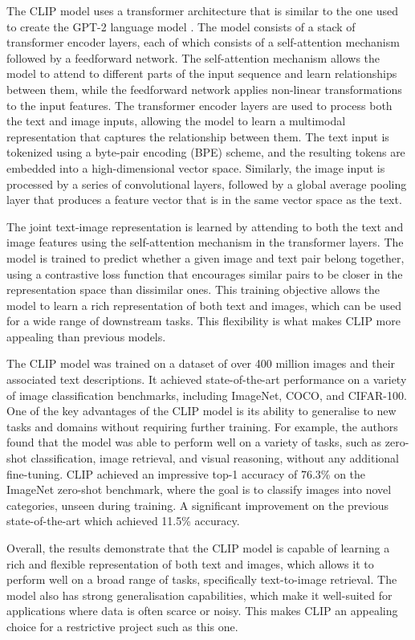 \documentclass{l4proj}
\begin{document}
The CLIP model uses a transformer architecture that is similar to the one used to create the GPT-2 language model \citep{radford2019gpt2}. The model consists of a stack of transformer encoder layers, each of which consists of a self-attention mechanism followed by a feedforward network. The self-attention mechanism allows the model to attend to different parts of the input sequence and learn relationships between them, while the feedforward network applies non-linear transformations to the input features. The transformer encoder layers are used to process both the text and image inputs, allowing the model to learn a multimodal representation that captures the relationship between them. The text input is tokenized using a byte-pair encoding (BPE) scheme, and the resulting tokens are embedded into a high-dimensional vector space. Similarly, the image input is processed by a series of convolutional layers, followed by a global average pooling layer that produces a feature vector that is in the same vector space as the text.

The joint text-image representation is learned by attending to both the text and image features using the self-attention mechanism in the transformer layers. The model is trained to predict whether a given image and text pair belong together, using a contrastive loss function that encourages similar pairs to be closer in the representation space than dissimilar ones. This training objective allows the model to learn a rich representation of both text and images, which can be used for a wide range of downstream tasks. This flexibility is what makes CLIP more appealing than previous models.

The CLIP model was trained on a dataset of over 400 million images and their associated text descriptions. It achieved state-of-the-art performance on a variety of image classification benchmarks, including ImageNet, COCO, and CIFAR-100. One of the key advantages of the CLIP model is its ability to generalise to new tasks and domains without requiring further training. For example, the authors found that the model was able to perform well on a variety of tasks, such as zero-shot classification, image retrieval, and visual reasoning, without any additional fine-tuning. CLIP achieved an impressive top-1 accuracy of 76.3\% on the ImageNet zero-shot benchmark, where the goal is to classify images into novel categories, unseen during training. A significant improvement on the previous state-of-the-art which achieved 11.5\% accuracy.

Overall, the results demonstrate that the CLIP model is capable of learning a rich and flexible representation of both text and images, which allows it to perform well on a broad range of tasks, specifically text-to-image retrieval. The model also has strong generalisation capabilities, which make it well-suited for applications where data is often scarce or noisy. This makes CLIP an appealing choice for a restrictive project such as this one.
\end{document}
